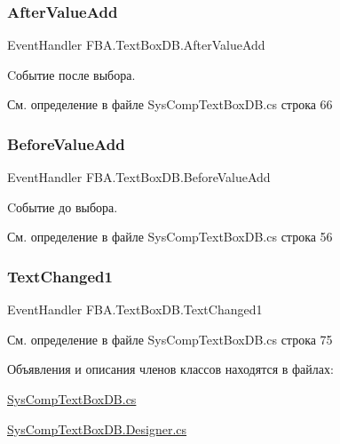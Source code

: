 \subsubsection{\texorpdfstring{After\+Value\+Add}{AfterValueAdd}}
{\footnotesize\ttfamily Event\+Handler F\+B\+A.\+Text\+Box\+D\+B.\+After\+Value\+Add}



Cобытие после выбора. 



См. определение в файле Sys\+Comp\+Text\+Box\+D\+B.\+cs строка 66

\mbox{\label{class_f_b_a_1_1_text_box_d_b_a55dd984787b1c540d3d7ef753cace83c}} 
\subsubsection{\texorpdfstring{Before\+Value\+Add}{BeforeValueAdd}}
{\footnotesize\ttfamily Event\+Handler F\+B\+A.\+Text\+Box\+D\+B.\+Before\+Value\+Add}



Cобытие до выбора. 



См. определение в файле Sys\+Comp\+Text\+Box\+D\+B.\+cs строка 56

\mbox{\label{class_f_b_a_1_1_text_box_d_b_abf3f3c24cff90f9f29d4995fb4423943}} 
\subsubsection{\texorpdfstring{Text\+Changed1}{TextChanged1}}
{\footnotesize\ttfamily Event\+Handler F\+B\+A.\+Text\+Box\+D\+B.\+Text\+Changed1}



См. определение в файле Sys\+Comp\+Text\+Box\+D\+B.\+cs строка 75



Объявления и описания членов классов находятся в файлах\+:\begin{DoxyCompactItemize}
\item 
\mbox{\hyperlink{_sys_comp_text_box_d_b_8cs}{Sys\+Comp\+Text\+Box\+D\+B.\+cs}}\item 
\mbox{\hyperlink{_sys_comp_text_box_d_b_8_designer_8cs}{Sys\+Comp\+Text\+Box\+D\+B.\+Designer.\+cs}}\end{DoxyCompactItemize}
